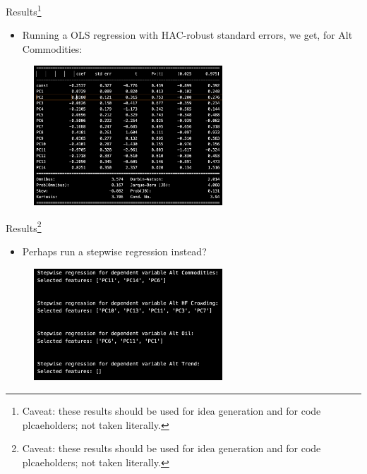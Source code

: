 \documentclass[dvipsnames,mathserif, handout]{beamer}
\begin{document}
{\begin{frame}{Results\footnote{\tiny Caveat: these results should be used for idea generation and for code plcaeholders; not taken literally.}}
	\begin{itemize}
		\item Running a OLS regression with HAC-robust standard errors, we get, for Alt Commodities:
	\end{itemize}
	\begin{figure}[!ht]
		\includegraphics[width=200pt]{alt_commodities.pdf}
	\end{figure}
\end{frame}

\begin{frame}{Results\footnote{\tiny Caveat: these results should be used for idea generation and for code plcaeholders; not taken literally.}}
	\begin{itemize}
		\item Perhaps run a stepwise regression instead?
	\end{itemize}
	\begin{figure}[!ht]
		\includegraphics[width=200pt]{stepwise_results_subset.pdf}
	\end{figure}
\end{frame}


}
\end{document}
